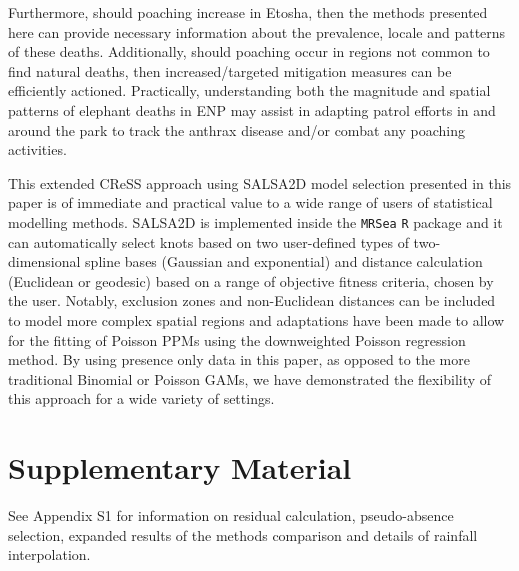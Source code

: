 \documentclass[letterpaper, 12pt]{interact}
\begin{document}
	Furthermore, should poaching increase in Etosha, then the methods presented here can provide necessary information about the prevalence, locale and patterns of these deaths. Additionally, should poaching occur in regions not common to find natural deaths, then increased/targeted mitigation measures can be efficiently actioned. Practically, understanding both the magnitude and spatial patterns of elephant deaths in ENP may assist in adapting patrol efforts in and around the park to track the anthrax disease and/or combat any poaching activities.
	
	This extended CReSS approach using SALSA2D model selection presented in this paper is of immediate and practical value to a wide range of users of statistical modelling methods. SALSA2D is implemented inside the \texttt{MRSea} \texttt{R} package and it can automatically select knots based on two user-defined types of two-dimensional spline bases (Gaussian and exponential) and distance calculation (Euclidean or geodesic) based on a range of objective fitness criteria, chosen by the user. Notably, exclusion zones and non-Euclidean distances can be included to model more complex spatial regions \cite[as seen in][]{scott2014, scott2017} and adaptations have been made to allow for the fitting of Poisson PPMs using the downweighted Poisson regression method. By using presence only data in this paper, as opposed to the more traditional Binomial or Poisson GAMs, we have demonstrated the flexibility of this approach for a wide variety of settings.
	
	
	
	
	
	
	\section*{Supplementary Material}\label{supplementary-material}
	
	See Appendix S1 for information on residual calculation, pseudo-absence selection, expanded results of the methods comparison and details of rainfall interpolation.
	
\end{document}
